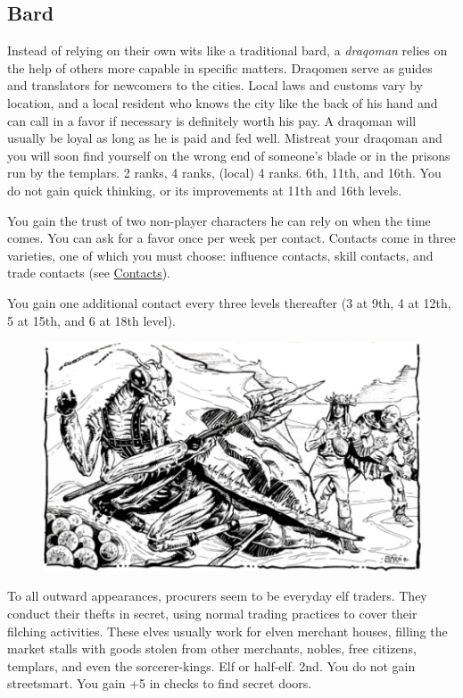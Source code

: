 \subsection{Bard}
{Instead of relying on their own wits like a traditional bard, a \emph{draqoman} relies on the help of others more capable in specific matters. Draqomen serve as guides and translators for newcomers to the cities. Local laws and customs vary by location, and a local resident who knows the city like the back of his hand and can call in a favor if necessary is definitely worth his pay. A draqoman will usually be loyal as long as he is paid and fed well. Mistreat your draqoman and you will soon find yourself on the wrong end of someone's blade or in the prisons run by the templars.}
{ 2 ranks,  4 ranks,  (local) 4 ranks.}
{6th, 11th, and 16th.}
{You do not gain quick thinking, or its improvements at 11th and 16th levels.}
{
	You gain the trust of two non-player characters he can rely on when the time comes. You can ask for a favor once per week per contact. Contacts come in three varieties, one of which you must choose: influence contacts, skill contacts, and trade contacts (see \hyperref[sec:contacts]{Contacts}).

	You gain one additional contact every three levels thereafter (3 at 9th, 4 at 12th, 5 at 15th, and 6 at 18th level).
}

\begin{figure}[t!]
\centering
\includegraphics[width=\textwidth-1cm]{images/thrikreen-1.png}
\WOTC
\end{figure}
{To all outward appearances, procurers seem to be everyday elf traders. They conduct their thefts in secret, using normal trading practices to cover their filching activities. These elves usually work for elven merchant houses, filling the market stalls with goods stolen from other merchants, nobles, free citizens, templars, and even the sorcerer-kings.}
{Elf or half-elf.}
{2nd.}
{You do not gain streetsmart.}
{
	You gain +5 in  checks to find secret doors.
}

